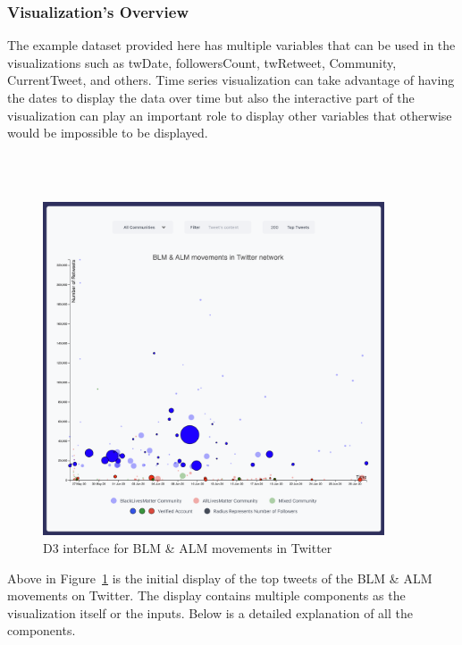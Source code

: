 \subsubsection{Visualization's Overview}

The example dataset provided here has multiple variables that can be used in the visualizations such as twDate, followersCount, twRetweet, Community, CurrentTweet, and others. Time series visualization can take advantage of having the dates to display the data over time but also the interactive part of the visualization can play an important role to display other variables that otherwise would be impossible to be displayed.

\\\


\begin{figure}[H]
\centering
\captionsetup{justification=centering}
\includegraphics[width=0.9\textwidth]{Report-latex/tex_files/pics/example/main.png}
\caption{D3 interface for BLM \& ALM movements in Twitter}
\label{fig:main-interface}
\end{figure}



Above in Figure~\ref{fig:main-interface} is the initial display of the top tweets of the  BLM \& ALM movements on Twitter. The display contains multiple components as the visualization itself or the inputs. Below is a detailed explanation of all the components.


